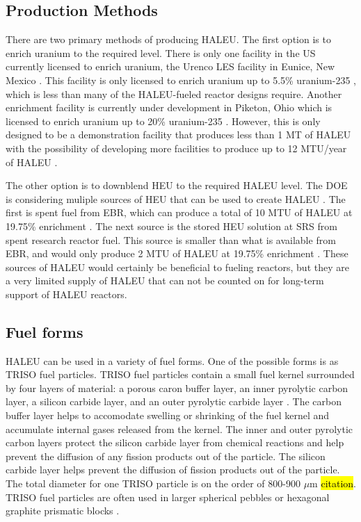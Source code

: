 \subsection{Production Methods}
There are two primary methods of producing \gls{HALEU}. The first 
option is to enrich uranium to the required level. There is only one 
facility in the US currently 
licensed to enrich uranium, the Urenco LES facility in Eunice, 
New Mexico \cite{noauthor_establishing_2022}. This facility is only 
licensed to enrich uranium up to 5.5\% uranium-235 \cite{noauthor_establishing_2022},
which is less than many of the \gls{HALEU}-fueled reactor designs 
require. Another enrichment facility is currently under development in 
Piketon, Ohio which is licensed to enrich uranium up to 20\% 
uranium-235 \cite{noauthor_establishing_2022}. However, this is only 
designed to be a demonstration facility that produces less than 1 MT of 
\gls{HALEU} \cite{noauthor_establishing_2022} with the possibility of 
developing more facilities to produce up to 12 MTU/year of \gls{HALEU}
\cite{noauthor_establishing_2022}.

The other option is to downblend \gls{HEU} to the required \gls{HALEU}
level. The \gls{DOE} is considering muliple sources of \gls{HEU} that can 
be used to create \gls{HALEU} \cite{noauthor_establishing_2022}. The 
first is spent fuel from \gls{EBR}, which can produce a total of 10 MTU 
of \gls{HALEU} at 19.75\% enrichment \cite{noauthor_establishing_2022}. 
The next source is the stored \gls{HEU} solution at \gls{SRS} from 
spent research reactor fuel. This source is smaller than what is 
available from \gls{EBR}, and would only produce 2 MTU of \gls{HALEU} 
at 19.75\% enrichment \cite{noauthor_establishing_2022}. These sources of 
\gls{HALEU} would certainly be beneficial to fueling reactors, but they 
are a very limited supply of \gls{HALEU} that can not be counted on 
for long-term support of \gls{HALEU} reactors. 


\subsection{Fuel forms}
\gls{HALEU} can be used in a variety of fuel forms. One of the possible 
forms is as \gls{TRISO} fuel particles. \gls{TRISO} fuel particles contain 
a small fuel kernel surrounded by four layers of material: a porous caron 
buffer layer, an inner pyrolytic carbon layer, a silicon carbide layer, and 
an outer pyrolytic carbide layer \cite{powers_fully_2014}. The carbon buffer
layer helps to accomodate swelling or shrinking of the fuel kernel and 
accumulate internal gases released from the kernel. The inner and outer 
pyrolytic carbon layers protect the silicon carbide layer from chemical 
reactions and help prevent the diffusion of any fission products out of the 
particle. The silicon carbide layer helps prevent the diffusion of fission 
products out of the particle. The total diameter for one \gls{TRISO} 
particle is on the order of 800-900 $\mu$m \hl{citation}. \gls{TRISO} fuel 
particles are often used in 
larger spherical pebbles or hexagonal graphite prismatic blocks 
\cite{powers_fully_2014}.

